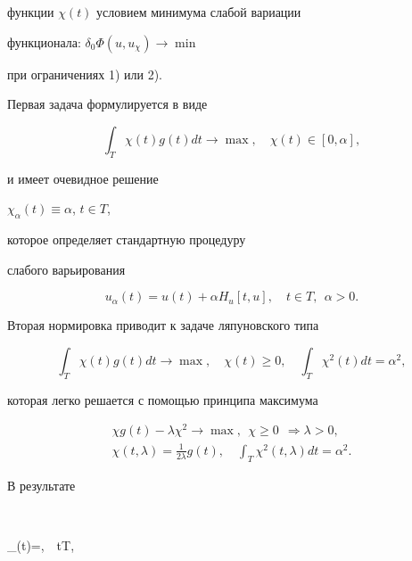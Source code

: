 функции $\chi(t)$ условием минимума слабой вариации


функционала: $\delta_{0}\Phi(u,u_{\chi}) \rightarrow \min$ 


при ограничениях 1) или 2).





Первая задача формулируется в виде


$$


\int_{T} \chi(t)g(t) dt \rightarrow \max,\quad \chi(t)\in [0,\alpha],


$$


и имеет очевидное решение


$\chi_{\alpha}(t) \equiv \alpha$, $t\in T$,


которое определяет стандартную процедуру


слабого варьирования


\begin{equation}


u_{\alpha}(t)=u(t)+\alpha H_{u}[t,u],\quad t\in T,\ \ \alpha>0.


\end{equation}





Вторая нормировка приводит к задаче ляпуновского типа


$$


\int_{T} \chi(t) g(t) dt \rightarrow \max,\quad 


\chi(t) \geq 0,\quad \int_{T} \chi^{2}(t) dt=\alpha^{2},


$$


которая легко решается с помощью принципа максимума


\begin{gather*}


\chi g(t) - \lambda \chi^{2} \rightarrow \max,


\ \ \chi \geq 0\ \ \Rightarrow \lambda>0,\\


\chi(t,\lambda)=\frac{1}{2\lambda} g(t),\quad


\int_{T} \chi^{2}(t,\lambda) dt=\alpha^{2}.


\end{gather*}





В результате


$$


\chi_{\alpha}(t)=\alpha {},\ \ t\in T,


